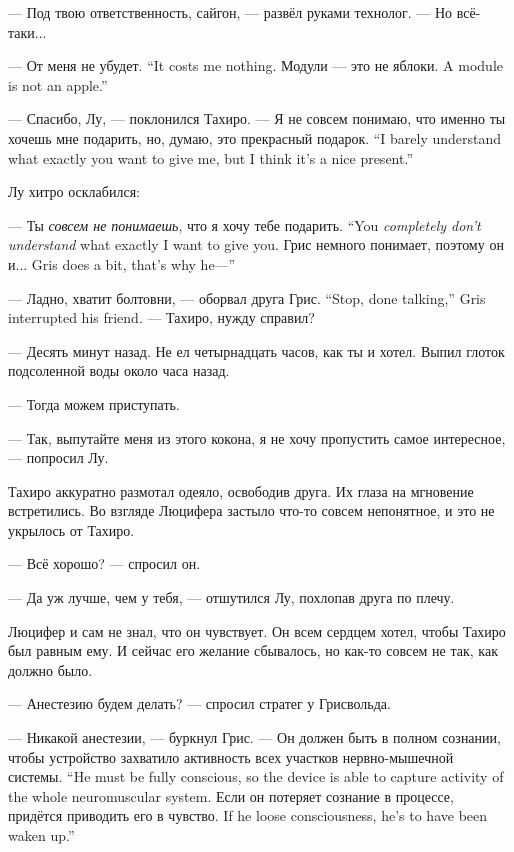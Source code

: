 --- Под твою ответственность, сайгон, --- развёл руками технолог.
--- Но всё-таки...

{--- От меня не убудет.}
{``It costs me nothing.}
{Модули --- это не яблоки.}
{A module is not an apple.''}

--- Спасибо, Лу, --- поклонился Тахиро.
{--- Я не совсем понимаю, что именно ты хочешь мне подарить, но, думаю, это прекрасный подарок.}
{``I barely understand what exactly you want to give me, but I think it's a nice present.''}

Лу хитро осклабился:

{--- Ты \emph{совсем не понимаешь}, что я хочу тебе подарить.}
{``You \emph{completely don't understand} what exactly I want to give you.}
{Грис немного понимает, поэтому он и...}
{Gris does a bit, that's why he---''}

{--- Ладно, хватит болтовни, --- оборвал друга Грис.}
{``Stop, done talking,'' Gris interrupted his friend.}
--- Тахиро, нужду справил?

--- Десять минут назад.
Не ел четырнадцать часов, как ты и хотел.
Выпил глоток подсоленной воды около часа назад.

--- Тогда можем приступать.

--- Так, выпутайте меня из этого кокона, я не хочу пропустить самое интересное, --- попросил Лу.

Тахиро аккуратно размотал одеяло, освободив друга.
Их глаза на мгновение встретились.
Во взгляде Люцифера застыло что-то совсем непонятное, и это не укрылось от Тахиро.

--- Всё хорошо? --- спросил он.

--- Да уж лучше, чем у тебя, --- отшутился Лу, похлопав друга по плечу.

Люцифер и сам не знал, что он чувствует.
Он всем сердцем хотел, чтобы Тахиро был равным ему.
И сейчас его желание сбывалось, но как-то совсем не так, как должно было.

--- Анестезию будем делать? --- спросил стратег у Грисвольда.

--- Никакой анестезии, --- буркнул Грис.
{--- Он должен быть в полном сознании, чтобы устройство захватило активность всех участков нервно-мышечной системы.}
{``He must be fully conscious, so the device is able to capture activity of the whole neuromuscular system.}
{Если он потеряет сознание в процессе, придётся приводить его в чувство.}
{If he loose consciousness, he's to have been waken up.''}

